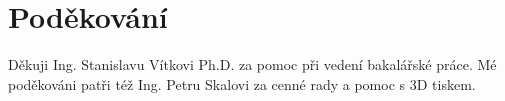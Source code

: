 \section*{Poděkování}
Děkuji Ing. Stanislavu Vítkovi Ph.D. za pomoc při vedení bakalářské práce. Mé poděkováni patři též Ing. Petru Skalovi za cenné rady a pomoc s 3D tiskem.
